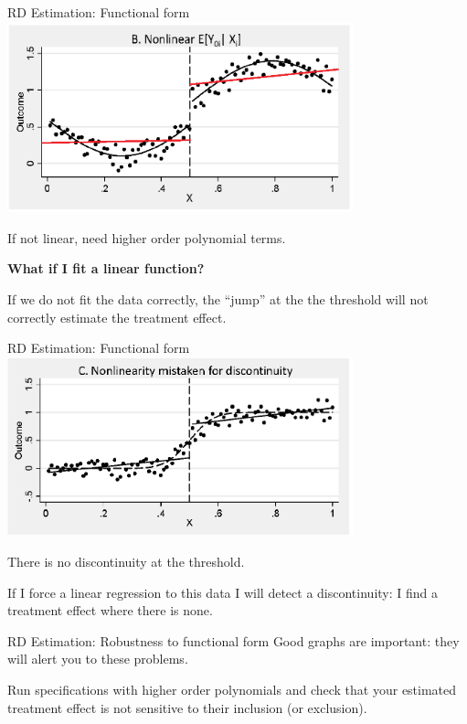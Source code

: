 \documentclass[
  ignorenonframetext,
]{beamer}
\begin{document}
\begin{frame}{RD Estimation: Functional form}
\protect\hypertarget{rd-estimation-functional-form-3}{}
\includegraphics[width=0.75\textwidth,height=\textheight]{"images/RDnonlinlin.png"}

If not linear, need higher order polynomial terms.

\textbf{What if I fit a linear function?}

If we do not fit the data correctly, the ``jump'' at the the threshold
will not correctly estimate the treatment effect.
\end{frame}

\begin{frame}{RD Estimation: Functional form}
\protect\hypertarget{rd-estimation-functional-form-4}{}
\includegraphics[width=0.75\textwidth,height=\textheight]{"images/RDmistake.png"}

There is no discontinuity at the threshold.

If I force a linear regression to this data I will detect a
discontinuity: I find a treatment effect where there is none.
\end{frame}

\begin{frame}{RD Estimation: Robustness to functional form}
\protect\hypertarget{rd-estimation-robustness-to-functional-form}{}
Good graphs are important: they will alert you to these problems.

Run specifications with higher order polynomials and check that your
estimated treatment effect is not sensitive to their inclusion (or
exclusion).
\end{frame}
\end{document}
